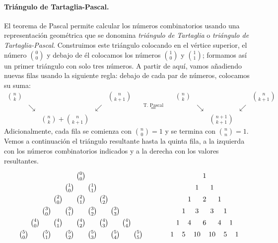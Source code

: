 \paragraph{Triángulo de Tartaglia-Pascal.}
El teorema de Pascal permite calcular los números combinatorios usando una representación geométrica que se donomina \emph{triángulo de Tartaglia} o \emph{triángulo de Tartaglia-Pascal}.
Construimos este triángulo colocando en el vértice superior, el número $\binom00$ y debajo de él colocamos los números $\binom10$ y $\binom11$; formamos así un primer triángulo con solo tres números.
A partir de aquí, vamos añadiendo nuevas filas usando la siguiente regla:
debajo de cada par de números, colocamos su suma:
\[
\begin{array}{ccccc}
\binom{n}{k} &&&& \binom{n}{k+1}\\
 & \searrow & & \swarrow & \\
&&\binom{n}{k}+\binom{n}{k+1}&&
\end{array}
\quad
\stackrel{\text{T. Pascal}}{=}
\quad
\begin{array}{ccccc}
\binom{n}{k} &&&& \binom{n}{k+1}\\
 & \searrow & & \swarrow & \\
&&\binom{n+1}{k+1}&&
\end{array}
\]
Adicionalmente, cada fila se comienza con $\binom{n}0=1$ y se termina con $\binom{n}n=1$.
Vemos a continuación el triángulo resultante hasta la quinta fila, a la izquierda con los números combinatorios indicados y a la derecha con los valores resultantes.
\[
\renewcommand{\arraystretch}{1.4}
\begin{array}{c@{\ }c%
@{\ }c%
@{\ }c%
@{\ }c%
@{\ }c%
@{\ }c%
@{\ }c%
@{\ }c%
@{\ }c%
@{\ }c}
& & & & & \binom{0}{0}\\
& & & & \binom{1}{0} & & \binom{1}{1} \\
& & & \binom{2}{0} & & \binom{2}{1} & & \binom{2}{2}\\
& & \binom{3}{0} & & \binom{3}{1} & & \binom{3}{2} & & \binom{3}{3}\\
& \binom{4}{0} & & \binom{4}{1} & & \binom{4}{2} & & \binom{4}{3} & & \binom{4}{4}\\
\binom{5}{0} & & \binom{5}{1} & & \binom{5}{2} & & \binom{5}{3} & & \binom{5}{4} & & \binom{5}{5}
\end{array}
\qquad\quad
\begin{array}{c@{\ }c%
@{\ }c%
@{\ }c%
@{\ }c%
@{\ }c%
@{\ }c%
@{\ }c%
@{\ }c%
@{\ }c%
@{\ }c}
& & & & & 1\\
& & & & 1 & & 1\\
& & & 1 & & 2 & & 1\\
 & & 1 & & 3 & & 3 & & 1\\
& 1 & & 4 & & 6 & & 4 & & 1\\
1 & & 5 & & 10 & & 10 & & 5 & & 1
\end{array}
\]


